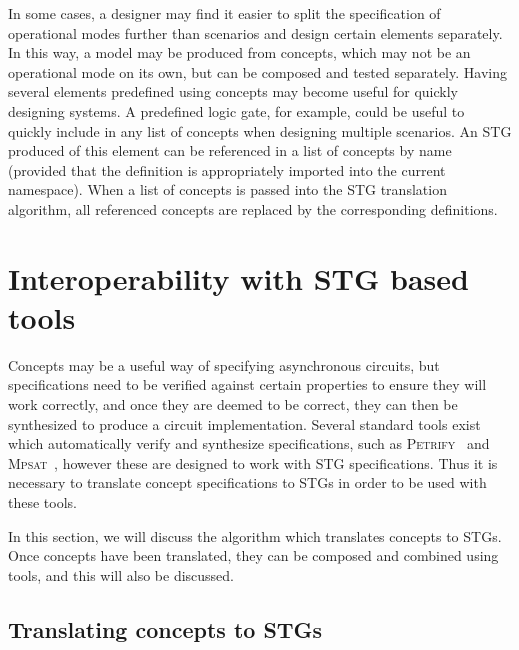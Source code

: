 \documentclass[british,compsoc]{IEEEtran}
\newcommand{\noun}[1]{\textsc{#1}}
\begin{document}
In some cases, a designer may find it easier to split the specification
of operational modes further than scenarios and design certain elements
separately. In this way, a model may be produced from concepts, which
may not be an operational mode on its own, but can be composed and
tested separately. Having several elements predefined
using concepts may become useful for quickly designing systems. A
predefined logic gate, for example, could be useful to quickly include
in any list of concepts when designing multiple scenarios. An STG
produced of this element can be referenced in a list of concepts by
name (provided that the definition is appropriately imported into
the current namespace). When a list of concepts is passed into the
STG translation algorithm, all referenced concepts are replaced by
the corresponding definitions.




\section{Interoperability with STG based tools \label{sec: interop-with-stg}}

Concepts may be a useful way of specifying asynchronous circuits, but specifications need to be verified against certain properties to ensure they will work correctly, and once they are
deemed to be correct, they can then be synthesized to produce a circuit implementation. Several standard tools exist which automatically verify and synthesize specifications, such as
\noun{Petrify}~\cite{Cortadella} and \noun{Mpsat}~\cite{khomenko2004detecting}, however these are designed to work with STG specifications. Thus it is necessary to translate
concept specifications to STGs in order to be used with these tools.

In this section, we will discuss the algorithm which translates concepts to STGs. Once concepts have been translated, they can be composed and combined using tools, and this will also
be discussed.


\subsection{Translating concepts to STGs \label {sub:translating}}
\end{document}
